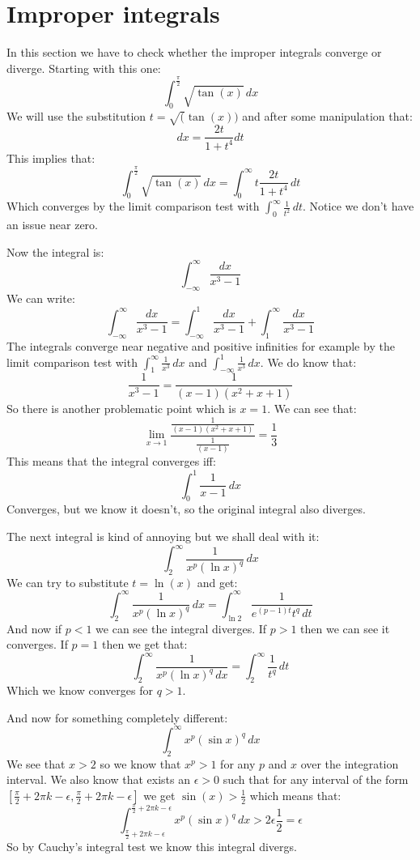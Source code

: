 \documentclass[11pt,a4paper]{article}
\begin{document}
	\section{Improper integrals}
	
	In this section we have to check whether the improper integrals converge
	or diverge. Starting with this one:
	\[
		\int_{0}^{\frac{\pi}{2}}{\sqrt{\tan(x)}\,dx}
	\]
	We will use the substitution $t = \sqrt(\tan(x))$ and after some
	manipulation that:
	\[
		dx = \frac{2t}{1+t^4}dt
	\]
	This implies that:
	\[
		\int_{0}^{\frac{\pi}{2}}{\sqrt{\tan(x)}\,dx} = 
		\int_{0}^{\infty}{t\frac{2t}{1+t^4}\,dt}
	\]
	Which converges by the limit comparison test with 
	$\int_{0}^{\infty}{\frac{1}{t^2}\,dt}$. Notice we don't have an issue
	near zero.
	
	\newpage
	
	Now the integral is:
	\[
		\int_{-\infty}^{\infty}{\frac{dx}{x^3-1}}
	\]
	We can write:
	\[
		\int_{-\infty}^{\infty}{\frac{dx}{x^3-1}} = 
		\int_{-\infty}^{1}{\frac{dx}{x^3-1}} + 
		\int_{1}^{\infty}{\frac{dx}{x^3-1}}
	\]
	The integrals converge near negative and positive infinities for example
	by the limit comparison test with $\int_{1}^{\infty}{\frac{1}{x^3}\,dx}$
	and $\int_{-\infty}^{1}{\frac{1}{x^3}\,dx}$. We do know that:
	\[
		\frac{1}{x^3-1} = 
		\frac{1}{(x-1)(x^2+x+1)}
	\]
	So there is another problematic point which is $x=1$. We can see that:
	\[
		\lim_{x\to 1}{\frac{\frac{1}{(x-1)(x^2+x+1)}}
		{\frac{1}{(x-1)}}} = \frac 13
	\]
	This means that the integral converges iff:
	\[
		\int_{0}^{1}{\frac{1}{x-1}\,dx}
	\]
	Converges, but we know it doesn't, so the original integral also diverges.
	
	\newpage
	
	The next integral is kind of annoying but we shall deal with it:
	\[
		\int_{2}^{\infty}{\frac{1}{x^p(\ln x)^q}\,dx}
	\]
	We can try to substitute $t = \ln(x)$ and get:
	\[
		\int_{2}^{\infty}{\frac{1}{x^p(\ln x)^q}\,dx} = 
		\int_{\ln 2}^{\infty}{\frac{1}{e^{(p-1)t}t^q\,dt}}
	\]
	And now if $p < 1$ we can see the integral diverges. If $p > 1$ then
	we can see it converges. If $p=1$ then we get that:
	\[
		\int_{2}^{\infty}{\frac{1}{x^p(\ln x)^q\,dx}} = 
		\int_{2}^{\infty}{\frac{1}{t^q}\,dt}
	\]
	Which we know converges for $q > 1$.
	
	\newpage
	
	And now for something completely different:
	\[
		\int_{2}^{\infty}{x^p(\sin x)^q\,dx}
	\]
	We see that $x > 2$ so we know that $x^p > 1$ for any $p$ and $x$ over
	the integration interval. We also know that exists an $\epsilon > 0$
	such that for any interval of the form
	$[\frac{\pi}{2} + 2\pi k - \epsilon, \frac{\pi}{2} + 2\pi k - \epsilon]$
	we get $\sin(x) > \frac 12$ which means that:
	\[
		\int_{\frac{\pi}{2} + 2\pi k - \epsilon}^
		{\frac{\pi}{2} + 2\pi k - \epsilon}{x^p(\sin x)^q\,dx} > 
		2\epsilon \frac {1}{2} = \epsilon
	\]
	So by Cauchy's integral test we know this integral divergs.
	
\end{document}
